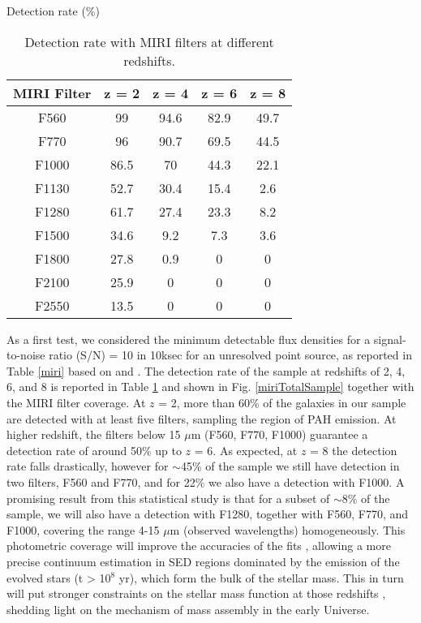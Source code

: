 \documentclass{aa}
\begin{document}
\begin{table}\centering
Detection rate (\%)
\begin{tabular}{c|c|c|c|c}
\hline
MIRI Filter &  z = 2 & z = 4 & z = 6 & z = 8 \\
\hline
F560   & 99 & 94.6 & 82.9  & 49.7\\
F770   & 96 & 90.7 & 69.5 & 44.5\\
F1000   & 86.5 & 70 & 44.3 & 22.1\\
F1130   & 52.7 & 30.4 & 15.4 & 2.6\\
F1280   & 61.7 & 27.4  & 23.3 & 8.2\\
F1500   & 34.6 & 9.2 & 7.3 & 3.6\\
F1800   & 27.8 & 0.9 & 0 & 0\\
F2100   & 25.9 & 0 & 0 & 0\\
F2550   & 13.5 & 0 & 0 & 0\\
\hline
\end{tabular}
\caption{Detection rate with MIRI filters at different redshifts.}\label{detectionrate}
\end{table}

As a first test, we considered the minimum detectable flux densities for a signal-to-noise ratio (S/N) = 10 in 10ksec for an unresolved point source, as reported in Table \ref{miri} based on \cite{gla} and \cite{pon}. The detection rate of the sample at redshifts of 2, 4, 6, and 8 is reported in Table \ref{detectionrate} and shown in Fig. \ref{miriTotalSample} together with the MIRI filter coverage. At $z$ = 2, more than 60\% of the galaxies in our sample are detected with at least five filters, sampling the region of PAH emission. At higher redshift, the filters below 15 $\mu$m (F560, F770, F1000) guarantee a detection rate of around 50\% up to $z$ = 6. As expected, at $z$ = 8 the detection rate falls drastically, however for $\sim$45\% of the sample we still have detection in two filters, F560 and F770, and for 22\% we  also have a detection with F1000. A promising result from this statistical study is that for a subset of $\sim$8\% of the sample, we will also have a detection with F1280, together with F560, F770, and F1000, covering  the range 4-15 $\mu$m (observed wavelengths) homogeneously. This photometric coverage will improve the accuracies of the fits \citep{bis1,bis2,kau}, allowing a more precise continuum estimation in SED regions dominated by the emission of the evolved stars (t > 10$^8$ yr), which form the bulk of the stellar mass. This in turn will put stronger constraints on the stellar mass function at those redshifts \citep[see e.g.][]{fur,ilb2}, shedding light on the mechanism of mass assembly in the early Universe.
\end{document}
